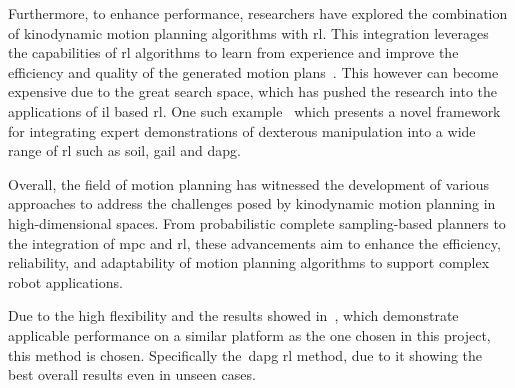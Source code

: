 Furthermore, to enhance performance, researchers have explored the combination of kinodynamic motion planning algorithms with \gls{rl}. This integration leverages the capabilities of \gls{rl} algorithms to learn from experience and improve the efficiency and quality of the generated motion plans~\cite{sampling-based-exploration-for-reinforcement-learning-of-dexterous-manipulation}. This however can become expensive due to the great search space, which has pushed the research into the applications of \gls{il} based \gls{rl}. One such example~\cite{dexmv:-imitation-learning-for-dexterous-manipulation-from-human-videos} which presents a novel framework for integrating expert demonstrations of dexterous manipulation into a wide range of \gls{rl} such as \gls{soil}, \gls{gail} and \gls{dapg}. \medskip

Overall, the field of motion planning has witnessed the development of various approaches to address the challenges posed by kinodynamic motion planning in high-dimensional spaces. From probabilistic complete sampling-based planners to the integration of \gls{mpc} and \gls{rl}, these advancements aim to enhance the efficiency, reliability, and adaptability of motion planning algorithms to support complex robot applications. \medskip

Due to the high flexibility and the results showed in~\cite{dexmv:-imitation-learning-for-dexterous-manipulation-from-human-videos}, which demonstrate applicable performance on a similar platform as the one chosen in this project, this method is chosen. Specifically the~\gls{dapg} \gls{rl} method, due to it showing the best overall results even in unseen cases.